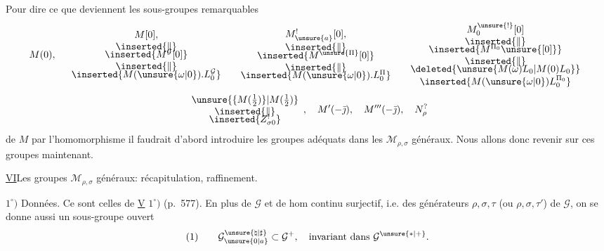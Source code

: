 Pour dire ce que deviennent les sous-groupes remarquables
\[
M(0),\quad
\begin{array}{c}
M[0],\\
\inserted{\Vert}\\[-4pt]
\inserted{M^{\mathcal{G}}[0]}\\
\inserted{\Vert}\\[-4pt]
\inserted{M(\unsure{\omega|0}).L_{0}^{\mathcal{G}}}
\end{array}
\quad
\begin{array}{c}
M_{\unsure{a}}^{!}[0],\\
\inserted{\Vert}\\[-4pt]
\inserted{M^{\unsure{\Pi}}[0]}\\
\inserted{\Vert}\\[-4pt]
\inserted{M(\unsure{\omega|0}).L_{0}^{\Pi}}
\end{array}
\quad
\begin{array}{c}
M_{0}^{\unsure{!}}[0]\\
\inserted{\Vert}\\[-4pt]
\inserted{M^{\Pi_{0}}\unsure{[0]}}\\
\inserted{\Vert}\\[-4pt]
\deleted{\unsure{M(\omega)L_{0}|M(0)L_{0}}}\\
\inserted{M(\unsure{\omega|0})L_{0}^{\Pi_{0}}}
\end{array}
\]
\[
\begin{array}{c}
\unsure{\{M(\tfrac12)\}|M(\tfrac12)}\\
\inserted{\Vert}\\[-4pt]
\inserted{Z_{\sigma0}^{!}}
\end{array},\quad
M'(-\bar{\jmath}),\quad M'''(-\bar{\jmath}),\quad N_{\rho}^{?}
\]
de $M$ par l'homomorphisme
il faudrait d'abord introduire les groupes adéquats dans les $\mathcal{M}_{\rho,\sigma}$
généraux. Nous allons donc revenir sur ces groupes maintenant.



\uline{VI}\quad Les groupes $\mathcal{M}_{\rho,\sigma}$ généraux:
récapitulation, raffinement.

$1^\circ)$ Données. Ce sont celles de \uline{V} $1^\circ)$ (p.~577).
En plus de $\mathcal{G}$  et de
hom continu surjectif, i.e. des générateurs $\rho,\sigma,\tau$
(ou $\rho,\sigma,\tau'$) de $\mathcal{G}$, on se donne aussi un sous-groupe ouvert
\[
(1)\qquad \mathcal{G}_{\unsure{0|a}}^{\unsure{\natural|\sharp}}
\subset\mathcal{G}^{+},\quad
\text{invariant dans }\mathcal{G}^{\unsure{*|+}}.
\]

